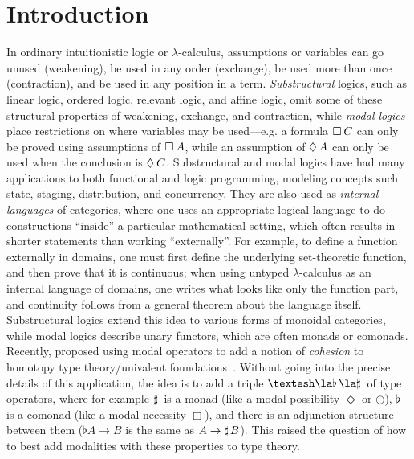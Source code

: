 
\section{Introduction}

In ordinary intuitionistic logic or $\lambda$-calculus, assumptions or
variables can go unused (weakening), be used in any order (exchange), be
used more than once (contraction), and be used in any position in a
term.  \emph{Substructural} logics, such as linear logic, ordered logic,
relevant logic, and affine logic, omit some of these structural
properties of weakening, exchange, and contraction, while \emph{modal
  logics} place restrictions on where variables may be used---e.g. a
formula $\Box_{} \, {C}$ can only be proved using assumptions of $\Box_{} \, {A}$,
while an assumption of $\Diamond_{} \, {A}$ can only be used when the conclusion
is $\Diamond_{} \, {C}$.  Substructural and modal logics have had many
applications to both functional and logic programming, modeling concepts
such state, staging, distribution, and concurrency.
They are also used as \emph{internal languages} of categories, where one
uses an appropriate logical language to do constructions ``inside'' a
particular mathematical setting, which often results in shorter
statements than working ``externally''.  For example, to define a
function externally in domains, one must first define the underlying
set-theoretic function, and then prove that it is continuous; when using
untyped $\lambda$-calculus as an internal language of domains, one
writes what looks like only the function part, and continuity follows
from a general theorem about the language itself.  Substructural logics
extend this idea to various forms of monoidal categories, while modal
logics describe unary functors, which are often monads or comonads.  Recently,
\citet{schreibershulman12cohesive,shulman15realcohesion} proposed using
modal operators to add a notion of \emph{cohesion} to homotopy type
theory/univalent foundations~\citep{voevodsky06homotopy,uf13hott-book}.
Without going into the precise details of this application, the idea is
to add a triple $\sh{} \la \Flat{} \la \Sharp{}$ of type operators,
where for example $\sharp \, {}$ is a monad (like a modal possibility
$\Diamond$ or $\bigcirc$), $\flat \, {}$ is a comonad (like a modal
necessity $\Box$), and there is an adjunction structure between them
($\flat{A} \to B$ is the same as $A \to \sharp \, {B}$).  This raised the
question of how to best add modalities with these properties to type
theory.

